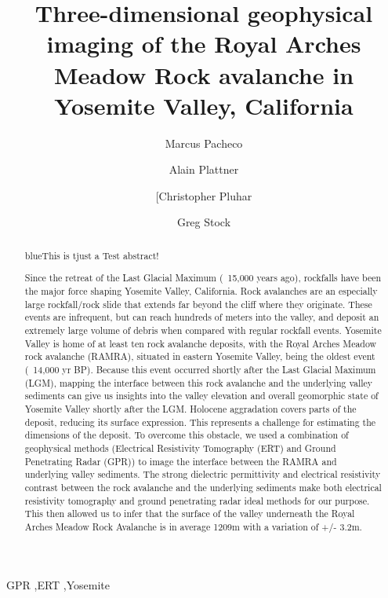 \documentclass[5p]{elsarticle}
\newcommand{\COMON}{\begin{color}{blue}}
\newcommand{\COMOFF}{\end{color}}
\begin{document}
	\begin{frontmatter}

\title{Three-dimensional geophysical imaging of the Royal Arches Meadow Rock avalanche in Yosemite Valley, California}

\author[Marcus]{Marcus Pacheco}
\address[Marcus]{California State University, Fresno}

\author[Alain]{Alain Plattner}
\address[Alain]{University of Alabama}

\author[Chris]{[Christopher Pluhar}
\address[Chris]{California State University, Fresno}

\author[Greg]{Greg Stock}
\address[Greg]{Yosemite National Park}



										\begin{abstract}
										
\COMON This is tjust a Test abstract!\COMOFF Since the retreat of the Last Glacial Maximum (~15,000 years ago), rockfalls have been the major force shaping Yosemite Valley, California. Rock avalanches are an especially large rockfall/rock slide that extends far beyond the cliff where they originate. These events are infrequent, but can reach hundreds of meters into the valley, and deposit an extremely large volume of debris when compared with regular rockfall events. Yosemite Valley is home of at least ten rock avalanche deposits, with the Royal Arches Meadow rock avalanche (RAMRA), situated in eastern Yosemite Valley, being the oldest event (~14,000 yr BP). Because this event occurred shortly after the Last Glacial Maximum (LGM), mapping the interface between this rock avalanche and the underlying valley sediments can give us insights into the valley elevation and overall geomorphic state of Yosemite Valley shortly after the LGM.  Holocene aggradation covers parts of the deposit, reducing its surface expression. This represents a challenge for estimating the dimensions of the deposit. To overcome this obstacle, we used a combination of geophysical methods (Electrical Resistivity Tomography (ERT) and Ground Penetrating Radar (GPR)) to image the interface between the RAMRA and underlying valley sediments. The strong dielectric permittivity and electrical resistivity contrast between the rock avalanche and the underlying sediments make both electrical resistivity tomography and ground penetrating radar ideal methods for our purpose. This then allowed us to infer that the surface of the valley underneath the Royal Arches Meadow Rock Avalanche is in average 1209m with a variation of +/- 3.2m.

									\end{abstract}

					\begin{keyword}
GPR \sep ERT \sep Yosemite
					\end{keyword}

	\end{frontmatter}
\end{document}

